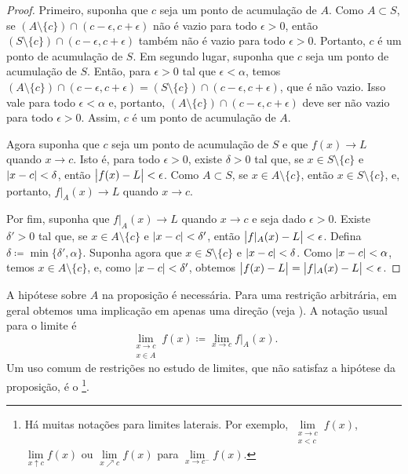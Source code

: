 \begin{proof}
Primeiro, suponha que $c$ seja um ponto de acumulação de $A$.
Como $A \subset S$, se $( A \setminus \{ c\} ) \cap
(c-\epsilon,c+\epsilon)$ não é vazio para todo $\epsilon > 0$,
então $( S \setminus \{ c\} ) \cap
(c-\epsilon,c+\epsilon)$ também não é vazio para todo $\epsilon > 0$.
Portanto, $c$ é um ponto de acumulação de $S$.
Em segundo lugar, suponha que $c$ seja um ponto de acumulação
de $S$. Então, para $\epsilon > 0$ tal que $\epsilon < \alpha$,
temos $( A \setminus \{ c\} ) \cap (c-\epsilon,c+\epsilon) =
( S \setminus \{ c\} ) \cap (c-\epsilon,c+\epsilon)$, que é não vazio.
Isso vale para todo $\epsilon < \alpha$ e, portanto,
$( A \setminus \{ c\} ) \cap (c-\epsilon,c+\epsilon)$ deve ser não vazio para todo
$\epsilon > 0$. Assim, $c$ é um ponto de acumulação de $A$.

Agora suponha que $c$ seja um ponto de acumulação de $S$ e que $f(x) \to L$ quando $x \to c$.
Isto é, para todo $\epsilon > 0$, existe $\delta > 0$ tal que, se
$x \in S \setminus \{ c \}$
e $\lvert {x-c} \rvert < \delta$, então $\bigl\lvert {f(x)-L} \bigr\rvert < \epsilon$. Como $A \subset S$,
se $x \in A \setminus \{ c \}$, então $x \in S \setminus \{ c \}$,
e, portanto, $f|_A(x) \to L$ quando $x \to c$.

Por fim, suponha que $f|_A(x) \to L$ quando $x \to c$ e seja dado $\epsilon > 0$.
Existe $\delta' > 0$ tal que, se $x \in A \setminus \{ c \}$
e $\lvert {x-c} \rvert < \delta'$, então $\bigl\lvert { f|_A(x)-L } \bigr\rvert < \epsilon$.
Defina $\delta \coloneqq \min \{ \delta', \alpha \}$.
Suponha agora que $x \in S \setminus \{ c \}$ e
$\lvert {x-c} \rvert < \delta$. Como $\lvert {x-c} \rvert < \alpha$, temos $x \in A \setminus \{ c \}$,
e, como $\lvert {x-c} \rvert < \delta'$,
obtemos $\bigl\lvert {f(x)-L} \bigr\rvert = \bigl\lvert { f|_A(x)-L } \bigr\rvert < \epsilon$.
\end{proof}

A hipótese sobre $A$ na proposição é necessária. Para uma restrição
arbitrária, em geral obtemos uma implicação em apenas uma direção
(veja ).
A notação usual para o limite é
\begin{equation*}
\lim_{\substack{x \to c\\x \in A}} f(x) \coloneqq \lim_{x \to c} f|_A(x) .
\end{equation*}
Um uso comum de restrições no estudo de limites, que não satisfaz
a hipótese da proposição, é o
\emph{}%
\footnote{%
Há muitas notações para limites laterais.
Por exemplo,
$\lim\limits_{\substack{x \to c\\x < c}} f(x)$,
$\lim\limits_{x \uparrow c} f(x)$ ou
$\lim\limits_{x \nearrow c} f(x)$ para
$\lim\limits_{x \to c^-} f(x)$.}.


